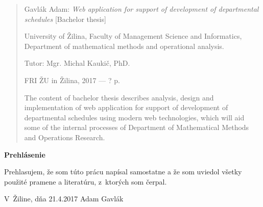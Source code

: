 

\begin{abstract}

\noindent
{\sc Gavlák Adam:} {\em Web application for support of development of departmental schedules}
[Bachelor thesis] 

\noindent
University of Žilina,  
Faculty of Management Science and Informatics, 
Department of mathematical methods and operational analysis.
 
\noindent
Tutor:  Mgr. Michal Kaukič, PhD.

\noindent
FRI ŽU in Žilina, 2017 --- ? p.

\bigskip

The content of bachelor thesis describes analysis, design and implementation of web application for support of development of departmental schedules using modern web technologies, which will aid some of the internal processes of Department of Mathematical Methods and Operations Research.

\end{abstract}


\newpage

\centerline{\bf Prehlásenie}

\vspace{2em}

\noindent
Prehlasujem, že som túto prácu napísal samostatne a že som uviedol 
všetky použité pramene a literatúru, z~ktorých som čerpal. 

\vspace{2em}

\noindent
V~Žiline, dňa 21.4.2017
\hfill
Adam Gavlák

